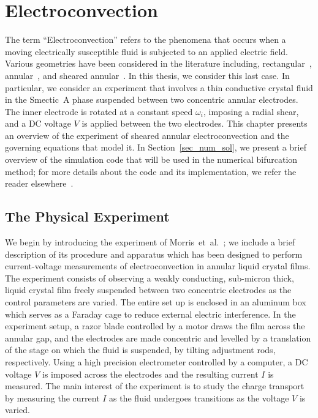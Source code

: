 \chapter{Electroconvection}\label{ch_ele}
The term ``Electroconvection'' refers to the phenomena that occurs when a moving electrically susceptible fluid
is subjected to an applied electric field. Various geometries have been considered in the literature including, rectangular~\cite{linearstability,WNAEISFF,pattern}, annular~\cite{Annular}, and sheared annular~\cite{EDCTAFUCF,BAEWIS,SBSAE,AEWSDaDe}.
In this thesis, we consider this last case. In particular, we consider an experiment that involves a thin conductive crystal fluid in the Smectic~A phase suspended between two concentric annular electrodes. The inner electrode is rotated at a constant speed $\omega_{i}$, imposing a radial shear, and a DC voltage $V$ is applied between the two electrodes. This chapter presents an overview of the experiment of sheared annular electroconvection  and the governing equations that model it. In Section~\ref{sec_num_sol}, we present a brief overview of the simulation code that will be used in the numerical bifurcation method; for more details about the code and its implementation, we refer the reader elsewhere~\cite{PeiChunTsain}.

\section{The Physical Experiment}\label{sec_phy_exp}
We begin by introducing the experiment of Morris~et~al.~\cite{AEWSDaDe}; we include a brief description of its procedure and apparatus which has been designed to perform current-voltage measurements of electroconvection in annular liquid crystal films.
The experiment consists of observing a weakly conducting, sub-micron thick, liquid crystal film freely suspended between two concentric electrodes as the control parameters are varied. The entire set up is enclosed in an aluminum box which serves as a Faraday cage to reduce external electric interference. In the experiment setup, a razor blade controlled by a motor draws the film across the annular gap, and the electrodes are made concentric and levelled by a translation of the stage on which the fluid is suspended, by tilting adjustment rods, respectively.
Using a high precision electrometer controlled by a computer, a DC voltage $V$ is imposed across the electrodes and the resulting current $I$ is measured.
The main interest of the experiment is to study the charge transport by measuring the current $I$  as the fluid undergoes transitions as the voltage $V$ is varied.

